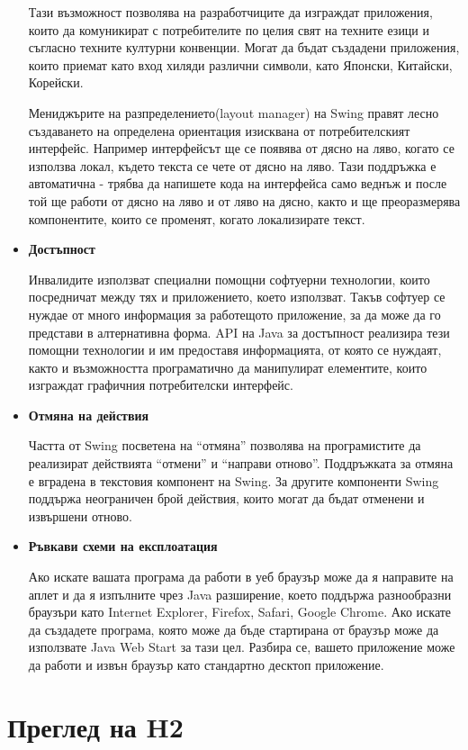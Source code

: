 \begin{itemize}
    Тази възможност позволява на разработчиците да изграждат
    приложения, които да комуникират с потребителите по целия свят на
    техните езици и съгласно техните културни конвенции. Могат да
    бъдат създадени приложения, които приемат като вход хиляди
    различни символи, като Японски, Китайски, Корейски.

    Мениджърите на разпределението(layout manager) на Swing правят
    лесно създаването на определена ориентация изисквана от
    потребителският интерфейс. Например интерфейсът ще се появява от
    дясно на ляво, когато се използва локал, където текста се чете от
    дясно на ляво. Тази поддръжка е автоматична - трябва да напишете
    кода на интерфейса само веднъж и после той ще работи от дясно на
    ляво и от ляво на дясно, както и ще преоразмерява компонентите,
    които се променят, когато локализирате текст.
  \item \textbf{Достъпност}

    Инвалидите използват специални помощни софтуерни технологии, които
    посредничат между тях и приложението, което използват. Такъв
    софтуер се нуждае от много информация за работещото приложение, за
    да може да го представи в алтернативна форма. API на Java за
    достъпност реализира тези помощни технологии и им предоставя
    информацията, от която се нуждаят, както и възможността
    програматично да манипулират елементите, които изграждат графичния
    потребителски интерфейс.
  \item \textbf{Отмяна на действия}

    Частта от Swing посветена на "`отмяна"' позволява на програмистите
    да реализират действията "`отмени"' и "`направи
    отново"'. Поддръжката за отмяна е вградена в текстовия компонент
    на Swing. За другите компоненти Swing поддържа неограничен брой
    действия, които могат да бъдат отменени и извършени отново.
  \item \textbf{Ръвкави схеми на експлоатация}

    Ако искате вашата програма да работи в уеб браузър може да я
    направите на аплет и да я изпълните чрез Java разширение, което
    поддържа разнообразни браузъри като Internet Explorer, Firefox,
    Safari, Google Chrome. Ако искате да създадете програма, която
    може да бъде стартирана от браузър може да използвате Java Web
    Start за тази цел. Разбира се, вашето приложение може да работи и
    извън браузър като стандартно десктоп приложение.
\end{itemize}
\section{Преглед на H2}
